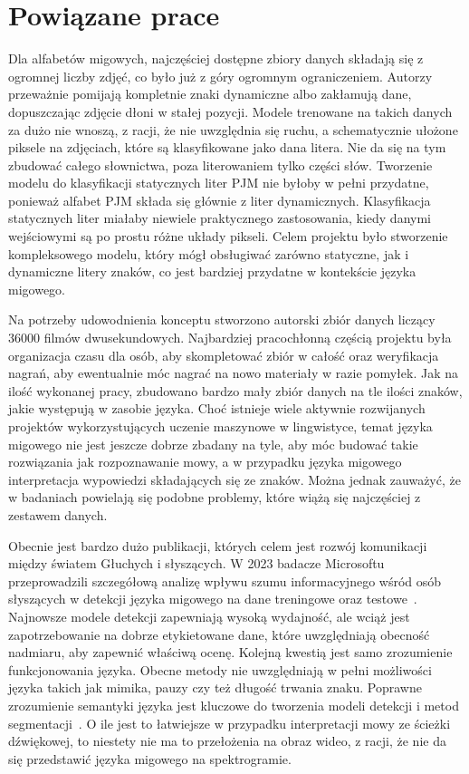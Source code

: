 \section{Powiązane prace}
\label{sec:related-works}

Dla alfabetów migowych, najczęściej dostępne zbiory danych składają się z ogromnej liczby zdjęć, co było już z góry ogromnym ograniczeniem. Autorzy przeważnie pomijają kompletnie znaki dynamiczne albo zakłamują dane, dopuszczając zdjęcie dłoni w stałej pozycji. Modele trenowane na takich danych za dużo nie wnoszą, z racji, że nie uwzględnia się ruchu, a schematycznie ułożone piksele na zdjęciach, które są klasyfikowane jako dana litera. Nie da się na tym zbudować całego słownictwa, poza literowaniem tylko części słów. Tworzenie modelu do klasyfikacji statycznych liter PJM nie byłoby w pełni przydatne, ponieważ alfabet PJM składa się głównie z liter dynamicznych. Klasyfikacja statycznych liter miałaby niewiele praktycznego zastosowania, kiedy danymi wejściowymi są po prostu różne układy pikseli. Celem projektu było stworzenie kompleksowego modelu, który mógł obsługiwać zarówno statyczne, jak i dynamiczne litery znaków, co jest bardziej przydatne w kontekście języka migowego.

Na potrzeby udowodnienia konceptu stworzono autorski zbiór danych liczący 36000 filmów dwusekundowych. Najbardziej pracochłonną częścią projektu była organizacja czasu dla osób, aby skompletować zbiór w całość oraz weryfikacja nagrań, aby ewentualnie móc nagrać na nowo materiały w razie pomyłek. Jak na ilość wykonanej pracy, zbudowano bardzo mały zbiór danych na tle ilości znaków, jakie występują w zasobie języka. Choć istnieje wiele aktywnie rozwijanych projektów wykorzystujących uczenie maszynowe w lingwistyce, temat języka migowego nie jest jeszcze dobrze zbadany na tyle, aby móc budować takie rozwiązania jak rozpoznawanie mowy, a w przypadku języka migowego interpretacja wypowiedzi składających się ze znaków. Można jednak zauważyć, że w badaniach powielają się podobne problemy, które wiążą się najczęściej z zestawem danych.

Obecnie jest bardzo dużo publikacji, których celem jest rozwój komunikacji między światem Głuchych i słyszących. W 2023 badacze Microsoftu przeprowadzili szczegółową analizę wpływu szumu informacyjnego wśród osób słyszących w detekcji języka migowego na dane treningowe oraz testowe~\cite{pal2023}. Najnowsze modele detekcji zapewniają wysoką wydajność, ale wciąż jest zapotrzebowanie na dobrze etykietowane dane, które uwzględniają obecność nadmiaru, aby zapewnić właściwą ocenę. Kolejną kwestią jest samo zrozumienie funkcjonowania języka. Obecne metody nie uwzględniają w pełni możliwości języka takich jak mimika, pauzy czy też długość trwania znaku. Poprawne zrozumienie semantyki języka jest kluczowe do tworzenia modeli detekcji i metod segmentacji~\cite{deSisto2021}. O ile jest to łatwiejsze w przypadku interpretacji mowy ze ścieżki dźwiękowej, to niestety nie ma to przełożenia na obraz wideo, z racji, że nie da się przedstawić języka migowego na spektrogramie.
